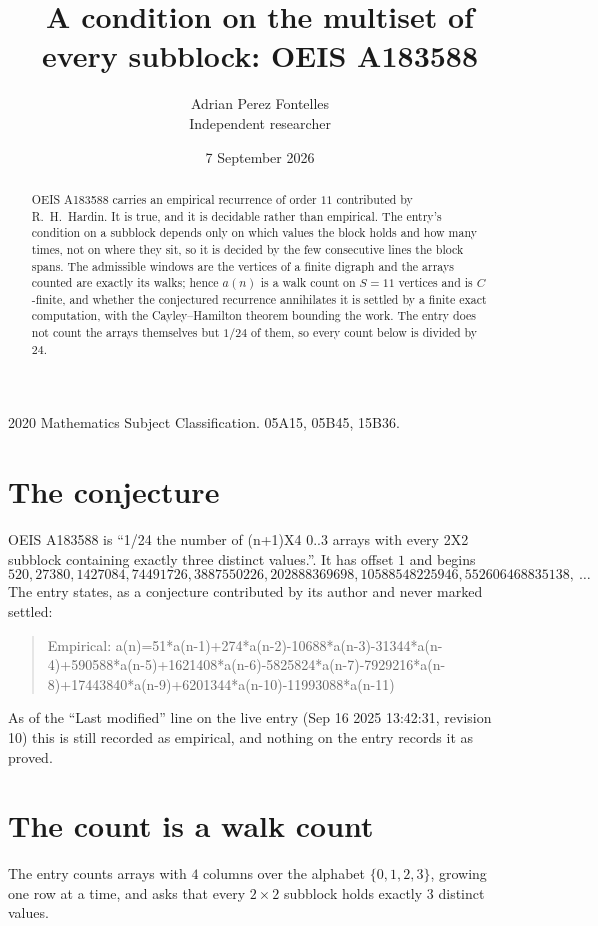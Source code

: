 \documentclass[11pt,a4paper]{article}
\title{A condition on the multiset of every subblock: OEIS A183588}
\author{Adrian Perez Fontelles\\ \small Independent researcher}
\date{7 September 2026}
\theoremstyle{plain}
\theoremstyle{definition}
\begin{document}
\maketitle

\begin{abstract}
OEIS A183588 carries an empirical recurrence of order $11$ contributed by R.~H.~Hardin. It is
true, and it is decidable rather than empirical. The entry's condition on a subblock depends
only on which values the block holds and how many times, not on where they sit, so it is
decided by the few consecutive lines the block spans. The admissible windows are the vertices
of a finite digraph and the arrays counted are exactly its walks; hence $a(n)$ is a walk count
on $S=11$ vertices and is $C$-finite, and whether the conjectured recurrence annihilates it
is settled by a finite exact computation, with the Cayley--Hamilton theorem bounding the
work. The entry does not count the arrays themselves but $1/24$ of them, so every count below is divided by $24$.
\end{abstract}

\noindent\small 2020 Mathematics Subject Classification. 05A15, 05B45, 15B36.\normalsize

\section{The conjecture}

OEIS A183588 is ``1/24 the number of (n+1)X4 0..3 arrays with every 2X2 subblock containing exactly three distinct values.''. It has offset $1$ and begins
\[
520, 27380, 1427084, 74491726, 3887550226, 202888369698, 10588548225946, 552606468835138,\ \dots
\]
The entry states, as a conjecture contributed by its author and never marked settled:
\begin{quote}
Empirical: a(n)=51*a(n-1)+274*a(n-2)-10688*a(n-3)-31344*a(n-4)+590588*a(n-5)+1621408*a(n-6)-5825824*a(n-7)-7929216*a(n-8)+17443840*a(n-9)+6201344*a(n-10)-11993088*a(n-11)
\end{quote}
As of the ``Last modified'' line on the live entry (Sep 16 2025 13:42:31, revision 10) this is still
recorded as empirical, and nothing on the entry records it as proved.

\section{The count is a walk count}

The entry counts arrays with $4$ columns over the alphabet $\{0,1,2,3\}$, growing one row at a time, and asks that every $2\times2$ subblock holds exactly $3$ distinct values.
\end{document}
